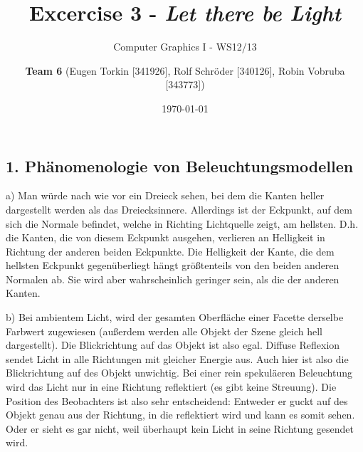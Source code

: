 \documentclass[a4paper,headings=small]{scrartcl}
\title{Excercise 3 - \emph{Let there be Light}}
\subtitle{Computer Graphics I - WS12/13}
\author{\textbf{Team 6} (Eugen Torkin [341926], Rolf Schröder [340126], Robin Vobruba [343773])}
\date{\today}
\numberwithin{equation}{section} %
\numberwithin{figure}{section}   %
\begin{document}
\maketitle


\subsection*{1. Phänomenologie von Beleuchtungsmodellen}
a) Man würde nach wie vor ein Dreieck sehen, bei dem die Kanten heller dargestellt werden als das Dreiecksinnere.
Allerdings ist der Eckpunkt, auf dem sich die Normale befindet, welche in Richting Lichtquelle zeigt, am hellsten.
D.h. die Kanten, die von diesem Eckpunkt ausgehen, verlieren an Helligkeit in Richtung der anderen beiden Eckpunkte.
Die Helligkeit der Kante, die dem hellsten Eckpunkt gegenüberliegt hängt größtenteils von den beiden anderen Normalen ab.
Sie wird aber wahrscheinlich geringer sein, als die der anderen Kanten.

b) Bei ambientem Licht, wird der gesamten Oberfläche einer Facette derselbe Farbwert zugewiesen (außerdem werden alle Objekt der Szene gleich hell dargestellt).
Die Blickrichtung auf das Objekt ist also egal.
Diffuse Reflexion sendet Licht in alle Richtungen mit gleicher Energie aus.
Auch hier ist also die Blickrichtung auf des Objekt unwichtig.
Bei einer rein spekuläeren Beleuchtung wird das Licht nur in eine Richtung reflektiert (es gibt keine Streuung).
Die Position des Beobachters ist also sehr entscheidend:
Entweder er guckt auf des Objekt genau aus der Richtung, in die reflektiert wird und kann es somit sehen.
Oder er sieht es gar nicht, weil überhaupt kein Licht in seine Richtung gesendet wird.
\end{document}
